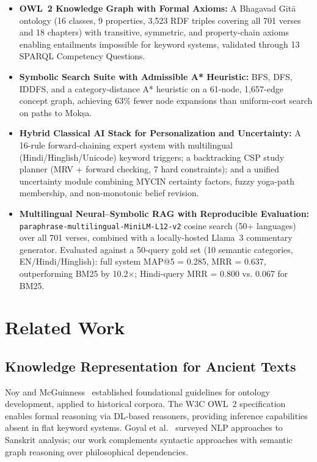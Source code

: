 \documentclass[conference]{IEEEtran}
\begin{document}
\begin{itemize}[leftmargin=*]
  \item \textbf{OWL~2 Knowledge Graph with Formal Axioms:} A Bhagavad
        G\={i}t\={a} ontology (16 classes, 9 properties, 3,523 RDF triples
        covering all 701 verses and 18 chapters) with transitive, symmetric,
        and property-chain axioms enabling entailments impossible for keyword
        systems, validated through 13 SPARQL Competency Questions.

  \item \textbf{Symbolic Search Suite with Admissible A* Heuristic:}
        BFS, DFS, IDDFS, and a category-distance A* heuristic on a
        61-node, 1,657-edge concept graph, achieving 63\% fewer node
        expansions than uniform-cost search on paths to Mok\d{s}a.

  \item \textbf{Hybrid Classical AI Stack for Personalization and
        Uncertainty:} A 16-rule forward-chaining expert system with
        multilingual (Hindi/Hinglish/Unicode) keyword triggers; a backtracking
        CSP study planner (MRV + forward checking, 7 hard constraints);
        and a unified uncertainty module combining MYCIN certainty factors,
        fuzzy yoga-path membership, and non-monotonic belief revision.

  \item \textbf{Multilingual Neural--Symbolic RAG with Reproducible Evaluation:}
        \texttt{paraphrase-multilingual-MiniLM-L12-v2} cosine search (50+ languages)
        over all 701 verses, combined with a locally-hosted Llama~3 commentary
        generator. Evaluated against a 50-query gold set (10 semantic categories,
        EN/Hindi/Hinglish): full system MAP@5 = 0.285, MRR = 0.637, outperforming
        BM25 by 10.2$\times$; Hindi-query MRR = 0.800 vs. 0.067 for BM25.
\end{itemize}

\section{Related Work}

\subsection{Knowledge Representation for Ancient Texts}

Noy and McGuinness~\cite{noy2001ontology} established foundational guidelines
for ontology development, applied to historical corpora. The W3C OWL~2
specification~\cite{mcguinness2004owl} enables formal reasoning via DL-based
reasoners, providing inference capabilities absent in flat keyword systems.
Goyal et al.~\cite{goyal2012sanskrit} surveyed NLP approaches to Sanskrit
analysis; our work complements syntactic approaches with semantic graph
reasoning over philosophical dependencies.
\end{document}
